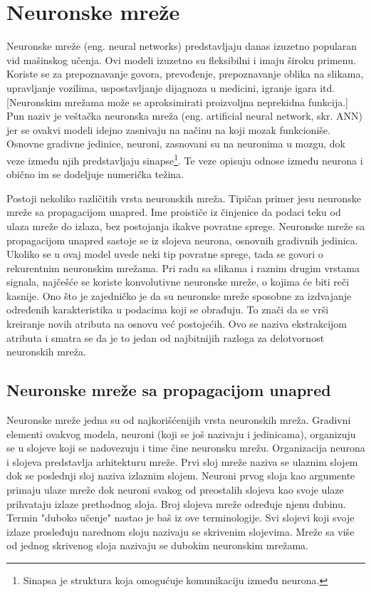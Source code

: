 \chapter{Neuronske mreže}
\label{ch:nn}

Neuronske mreže (eng. neural networks) predstavljaju danas izuzetno popularan vid mašinskog učenja. Ovi modeli izuzetno su fleksibilni i imaju široku primenu.  Koriste se za prepoznavanje govora, prevođenje, prepoznavanje oblika na slikama, upravljanje vozilima, uspostavljanje dijagnoza u medicini, igranje igara itd. [Neuronskim mrežama može se aproksimirati proizvoljna neprekidna funkcija.] Pun naziv je veštačka neuronska mreža (eng. artificial neural network, skr. ANN) jer se ovakvi modeli idejno zasnivaju na načinu na koji mozak funkcioniše. Osnovne gradivne jedinice, neuroni, zasnovani su na neuronima u mozgu, dok veze između njih predstavljaju sinapse\footnote{Sinapsa je struktura koja omogućuje komunikaciju između neurona.}. Te veze opisuju odnose između neurona i obično im se dodeljuje numerička težina.

\par
Postoji nekoliko različitih vrsta neuronskih mreža. Tipičan primer jesu neuronske mreže sa propagacijom unapred. Ime proističe iz činjenice da podaci teku od ulaza mreže do izlaza, bez postojanja ikakve povratne sprege. Neuronske mreže sa propagacijom unapred sastoje se iz slojeva neurona, osnovnih gradivnih jedinica. Ukoliko se u ovaj model uvede neki tip povratne sprege, tada se govori o rekurentnim neuronskim mrežama. Pri radu sa slikama i raznim drugim vrstama signala, najčešće se koriste konvolutivne neuronske mreže, o kojima će biti reči kasnije. Ono što je zajedničko je da su neuronske mreže sposobne za izdvajanje određenih karakteristika u podacima koji se obrađuju. To znači da se vrši kreiranje novih atributa na osnovu već postojećih. Ovo se naziva ekstrakcijom atributa i smatra se da je to jedan od najbitnijih razloga za delotvornost neuronskih mreža.

\section{Neuronske mreže sa propagacijom unapred}

Neuronske mreže jedna su od najkorišćenijih vrsta neuronskih mreža. Gradivni elementi ovakvog modela, neuroni (koji se još nazivaju i jedinicama), organizuju se u slojeve koji se nadovezuju i time čine neuronsku mrežu. Organizacija neurona i slojeva predstavlja arhitekturu mreže. Prvi sloj mreže naziva se ulaznim slojem dok se poslednji sloj naziva izlaznim slojem. Neuroni prvog sloja kao argumente primaju ulaze mreže dok neuroni svakog od preostalih slojeva kao svoje ulaze prihvataju izlaze prethodnog sloja. Broj slojeva mreže određuje njenu dubinu. Termin "duboko učenje" nastao je baš iz ove terminologije. Svi slojevi koji svoje izlaze prosleđuju narednom sloju nazivaju se skrivenim slojevima.  Mreže sa više od jednog skrivenog sloja nazivaju se dubokim neuronskim mrežama. 


